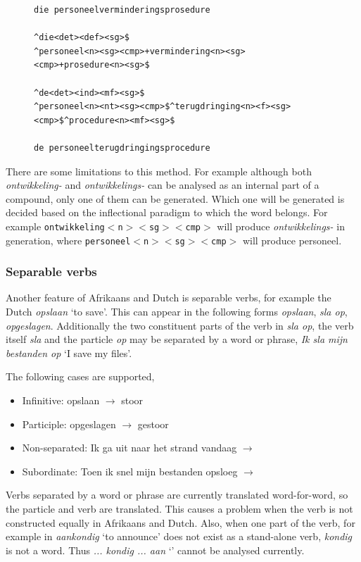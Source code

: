 \documentclass[11pt]{article}
\begin{document}
\begin{figure}
\begin{small}
\begin{verbatim}
die personeelverminderingsprosedure

^die<det><def><sg>$
^personeel<n><sg><cmp>+vermindering<n><sg><cmp>+prosedure<n><sg>$

^de<det><ind><mf><sg>$
^personeel<n><nt><sg><cmp>$^terugdringing<n><f><sg><cmp>$^procedure<n><mf><sg>$

de personeelterugdringingsprocedure
\end{verbatim}
\end{small}
\end{figure}

There are some limitations to this method. For example although
both {\em ontwikkeling-} and {\em ontwikkelings-} can be analysed as an internal part
of a compound, only one of them can be generated. Which one will be generated
is decided based on the inflectional paradigm to which the word belongs. For
example {\small {\tt ontwikkeling$<$n$><$sg$><$cmp$>$}} will produce {\em ontwikkelings-} in generation,
where {\small {\tt personeel$<$n$><$sg$><$cmp$>$}} will produce personeel.

\subsubsection{Separable verbs}

Another feature of Afrikaans and Dutch is separable verbs, for example
the Dutch {\em opslaan} `to save'. This can appear in the following
forms {\em opslaan}, {\em sla op}, {\em opgeslagen}. Additionally the two constituent
parts of the verb in {\em sla op}, the verb itself {\em sla} and the particle
{\em op} may be separated by a word or phrase, {\em Ik sla mijn bestanden op}
 `I save my files'.

The following cases are supported,

\begin{itemize}
\item Infinitive: opslaan $\rightarrow$ stoor 
\item Participle: opgeslagen $\rightarrow$ gestoor
\item Non-separated: Ik ga uit naar het strand vandaag $\rightarrow$
\item Subordinate: Toen ik snel mijn bestanden opsloeg $\rightarrow$ 
\end{itemize}

Verbs separated by a word or phrase are currently translated word-for-word,
so the particle and verb are translated. This causes a problem when the
verb is not constructed equally in Afrikaans and Dutch. Also, when one part
of the verb, for example in {\em aankondig} `to announce' does not exist as
a stand-alone verb, {\em kondig} is not a word. Thus {\em ... kondig ... aan} `'
cannot be analysed currently.
\end{document}
